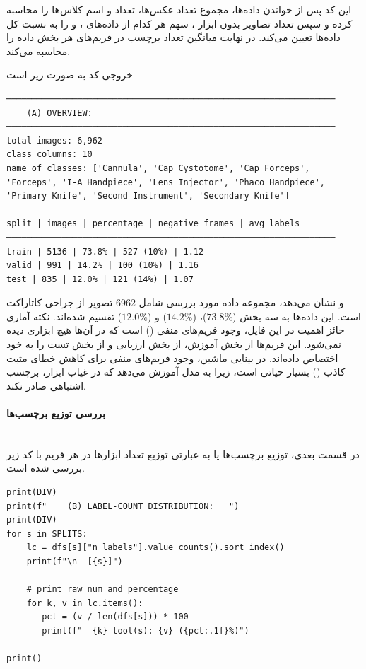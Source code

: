 \documentclass{article}
\begin{document}
این کد پس از خواندن داده‌ها، مجموع تعداد عکس‌ها، تعداد و اسم کلاس‌ها را محاسبه کرده و سپس تعداد تصاویر بدون ابزار ، سهم هر کدام از داده‌های ،  و  را به نسبت کل داده‌ها تعیین می‌کند. در نهایت میانگین تعداد برچسب در فریم‌های هر بخش داده را محاسبه می‌کند.

خروجی کد به صورت زیر است


\begin{latin}
\begin{LTR}
\begin{verbatim}
─────────────────────────────────────────────────────────────────
    (A) OVERVIEW:   
─────────────────────────────────────────────────────────────────
total images: 6,962
class columns: 10
name of classes: ['Cannula', 'Cap Cystotome', 'Cap Forceps', 'Forceps', 'I-A Handpiece', 'Lens Injector', 'Phaco Handpiece', 'Primary Knife', 'Second Instrument', 'Secondary Knife']

split | images | percentage | negative frames | avg labels
─────────────────────────────────────────────────────────────────
train | 5136 | 73.8% | 527 (10%) | 1.12
valid | 991 | 14.2% | 100 (10%) | 1.16
test | 835 | 12.0% | 121 (14%) | 1.07
\end{verbatim}
\end{LTR}
\end{latin}

و نشان می‌دهد، مجموعه داده مورد بررسی شامل 6962 تصویر از جراحی کاتاراکت است. این داده‌ها به سه بخش  ($73.8\%$)،  ($14.2\%$) و  ($12.0\%$) تقسیم شده‌اند. نکته آماری حائز اهمیت در این فایل، وجود فریم‌های منفی () است که در آن‌ها هیچ ابزاری دیده نمی‌شود. این فریم‌ها  از بخش آموزش،  از بخش ارزیابی و  از بخش تست را به خود اختصاص داده‌اند. در بینایی ماشین، وجود فریم‌های منفی برای کاهش خطای مثبت کاذب () بسیار حیاتی است، زیرا به مدل آموزش می‌دهد که در غیاب ابزار، برچسب اشتباهی صادر نکند.
\paragraph{بررسی توزیع برچسب‌ها}\mbox{}\\
در قسمت بعدی، توزیع برچسب‌ها یا به عبارتی توزیع تعداد ابزارها در هر فریم با کد زیر بررسی شده‌ است. 

\begin{latin}
\begin{LTR}
\begin{verbatim}
print(DIV)
print(f"    (B) LABEL-COUNT DISTRIBUTION:   ")
print(DIV)
for s in SPLITS:
    lc = dfs[s]["n_labels"].value_counts().sort_index()
    print(f"\n  [{s}]")

    # print raw num and percentage
    for k, v in lc.items():
       pct = (v / len(dfs[s])) * 100
       print(f"  {k} tool(s): {v} ({pct:.1f}%)")

print()
\end{verbatim}
\end{LTR}
\end{latin}
\end{document}
